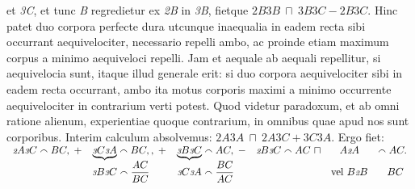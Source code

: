 et 
\textit{{\scriptsize3}C}, 
et
tunc 
\textit{B} 
regredietur ex 
\textit{{\scriptsize2}B} 
in 
\textit{{\scriptsize3}B}, 
fietque
%
${\scriptstyle \textit{2}}B{\scriptstyle \textit{3}}B\ \sqcap\ {\scriptstyle \textit{3}}B{\scriptstyle \textit{3}}C - {\scriptstyle \textit{2}}B{\scriptstyle \textit{3}}C$.
%
\pend \pstart
Hinc patet 
duo corpora perfecte dura%
\protect{} utcunque inaequalia%
\protect{} in eadem recta sibi occurrant 
aequivelociter, necessario repelli ambo, ac proinde etiam maximum corpus%
\protect{} a minimo%
\protect{} aequiveloci
repelli. Jam et aequale ab aequali repellitur, si aequivelocia sunt, itaque illud generale erit:
si duo corpora aequivelociter sibi in eadem recta occurrant, ambo
%
%
ita
motus corporis maximi\protect{} a minimo%
\protect{} occurrente aequivelociter in contrarium verti potest. Quod videtur 
paradoxum,%
\protect{} et ab omni ratione%
\protect{} alienum, experientiae%
\protect{} quoque contrarium, in omnibus quae apud nos sunt
corporibus. Interim calculum absolvemus:
\pend
%
\pstart
\noindent
%
${\scriptstyle \textit{2}}A{\scriptstyle \textit{3}}A\ \sqcap\ {\scriptstyle \textit{2}}A{\scriptstyle \textit{3}}C + {\scriptstyle \textit{3}}C{\scriptstyle \textit{3}}A$.
%
Ergo fiet:\pend
\pstart\noindent
%
$\begin{array}{cccccc}
{\scriptstyle \textit{2}}A{\scriptstyle \textit{3}}C \smallfrown BC,\; + %
& \underbrace{{\scriptstyle \textit{3}}C{\scriptstyle \textit{3}}A} \smallfrown BC,,\; + %
& \underbrace{{\scriptstyle \textit{3}}B{\scriptstyle \textit{3}}C} \smallfrown AC,\; - %
& {\scriptstyle \textit{2}}B{\scriptstyle \textit{3}}C \smallfrown AC\ \sqcap  %
& A{\scriptstyle \textit{2}}A%
&\smallfrown AC.\\
& {\displaystyle {\scriptstyle \textit{3}}B{\scriptstyle \textit{3}}C \smallfrown \displaystyle\frac{AC}{BC}}\;\;\;\;\;\; %
& {\displaystyle {\scriptstyle \textit{3}}C{\scriptstyle \textit{3}}A \smallfrown \displaystyle\frac{BC}{AC}}\;\;\;\; %
& & 
\textup{vel}\ B{\scriptstyle \textit{2}}B%
&\;\;BC
	\end{array}$
